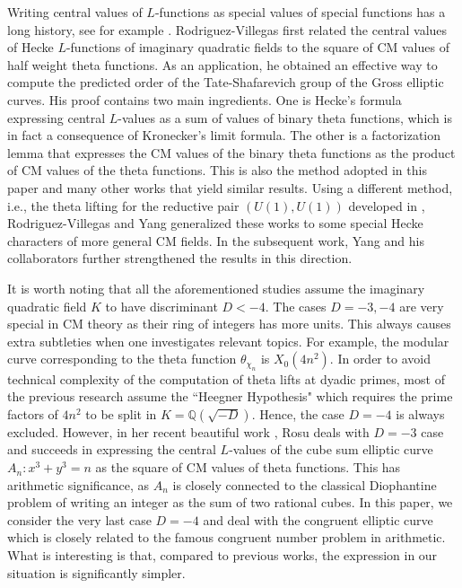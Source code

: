 \documentclass[11pt, reqno]{amsart}
\theoremstyle{plain}
\theoremstyle{definition}
\numberwithin{equation}{section}
\begin{document}
  
Writing  central values of $L$-functions as special values of special functions has a long history, see for example \cite{H,S1,S2,R1}. Rodriguez-Villegas \cite{V1,V1.5} first related the central values of Hecke $L$-functions of imaginary quadratic fields to the square of CM values of half weight theta functions. As an application, he obtained an effective way to compute the predicted order of the Tate-Shafarevich group of the Gross elliptic curves. His  proof contains two main ingredients. One is Hecke's formula expressing central $L$-values as a sum of values of binary theta functions, which is in fact a consequence of Kronecker's limit formula. The other is a factorization lemma that expresses
  the CM values of the binary theta functions as the product of CM values of the  theta functions. This is also the method adopted in this paper and many other works \cite{V2,V3,V4} that yield similar results. Using a different method, i.e., the theta lifting for the reductive pair $(U(1),U(1))$ developed in \cite{Y2}, Rodriguez-Villegas and Yang \cite{V4} generalized these works to some special Hecke characters of more general CM fields. In the subsequent work, Yang and his collaborators \cite{Y3,Y4,Y5} further strengthened the results in this direction.

It is worth noting that all the aforementioned studies assume the imaginary quadratic field $K$ to have discriminant $D<-4$. The cases $D=-3,-4$ are very special in CM theory as their ring of integers has more units. This always causes extra subtleties when one investigates relevant topics. For example, the modular curve corresponding to the theta function $\theta_{\chi_n}$
is $X_0(4n^2)$. In order to avoid technical complexity of the computation of theta lifts at dyadic primes, most of the previous research assume  the ``Heegner Hypothesis" which requires the prime factors of $4n^2$ to be split in $K=\mathbb{Q}(\sqrt{-D})$. Hence, the case $D=-4$ is always excluded. However, in her recent beautiful work \cite{R}, Rosu deals with $D=-3$ case and succeeds in expressing the central $L$-values of the cube sum elliptic curve $A_n: x^3+y^3=n$ as the square of CM values of theta functions. This has arithmetic significance, as $A_n$ is closely connected  to the classical Diophantine problem of writing an integer as the sum of two rational cubes. In this paper, we consider the very last case $D=-4$ and deal with the congruent elliptic curve which is closely related to the  famous congruent number problem in arithmetic. What is interesting is that, compared to previous works, the expression in our situation is significantly
  simpler. 
\end{document}
